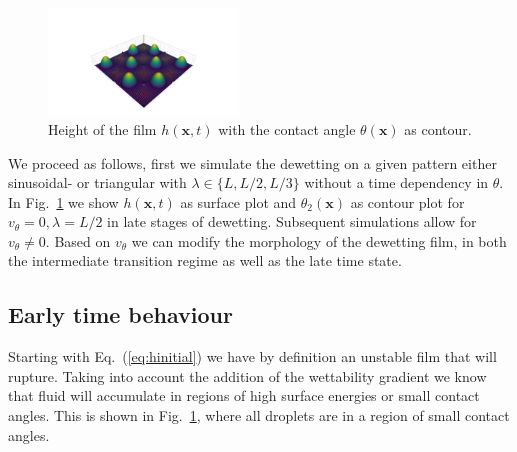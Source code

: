 \documentclass[twocolumn,amsmath,amssymb,showpacs,pre,nofootinbib,superscriptaddress]{revtex4-1} %
\begin{document}
\begin{figure}
    \centering
    \includegraphics[width=0.45\textwidth]{Figures/makie_try2.png}
    \caption{Height of the film $h(\mathbf{x},t)$ with the contact angle $\theta(\mathbf{x})$ as contour.}
    \label{fig:handtheta}
\end{figure}
We proceed as follows, first we simulate the dewetting on a given pattern either sinusoidal- or triangular with $\lambda \in \{L, L/2, L/3\}$ without a time dependency in $\theta$.
In Fig.~\ref{fig:handtheta} we show $h(\mathbf{x},t)$ as surface plot and $\theta_2(\mathbf{x})$ as contour plot for $v_{\theta} = 0, \lambda = L/2$ in late stages of dewetting.
Subsequent simulations allow for $v_{\theta} \ne 0$.  
Based on $v_{\theta}$ we can modify the morphology of the dewetting film, in both the intermediate transition regime as well as the late time state.

\subsection{Early time behaviour}\label{subsec:earlyT}
Starting with Eq.~(\ref{eq:hinitial}) we have by definition an unstable film that will rupture.
Taking into account the addition of the wettability gradient we know that fluid will accumulate in regions of high surface energies or small contact angles.
This is shown in Fig.~\ref{fig:handtheta}, where all droplets are in a region of small contact angles.
\end{document}
